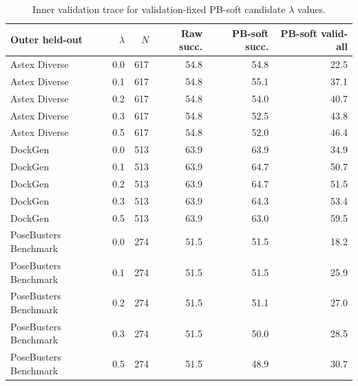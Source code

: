 \begin{table}[!ht]
\centering
\caption{Inner validation trace for validation-fixed PB-soft candidate $\lambda$ values.}
\label{tab:s_lambda_trace}
\small
\begin{tabular}{lrrrrr}
\toprule
Outer held-out & $\lambda$ & $N$ & Raw succ. & PB-soft succ. & PB-soft valid-all \\
\midrule
Astex Diverse & 0.0 & 617 & 54.8 & 54.8 & 22.5 \\
Astex Diverse & 0.1 & 617 & 54.8 & 55.1 & 37.1 \\
Astex Diverse & 0.2 & 617 & 54.8 & 54.0 & 40.7 \\
Astex Diverse & 0.3 & 617 & 54.8 & 52.5 & 43.8 \\
Astex Diverse & 0.5 & 617 & 54.8 & 52.0 & 46.4 \\
DockGen & 0.0 & 513 & 63.9 & 63.9 & 34.9 \\
DockGen & 0.1 & 513 & 63.9 & 64.7 & 50.7 \\
DockGen & 0.2 & 513 & 63.9 & 64.7 & 51.5 \\
DockGen & 0.3 & 513 & 63.9 & 64.3 & 53.4 \\
DockGen & 0.5 & 513 & 63.9 & 63.0 & 59.5 \\
PoseBusters Benchmark & 0.0 & 274 & 51.5 & 51.5 & 18.2 \\
PoseBusters Benchmark & 0.1 & 274 & 51.5 & 51.5 & 25.9 \\
PoseBusters Benchmark & 0.2 & 274 & 51.5 & 51.1 & 27.0 \\
PoseBusters Benchmark & 0.3 & 274 & 51.5 & 50.0 & 28.5 \\
PoseBusters Benchmark & 0.5 & 274 & 51.5 & 48.9 & 30.7 \\
\bottomrule
\end{tabular}
\end{table}
